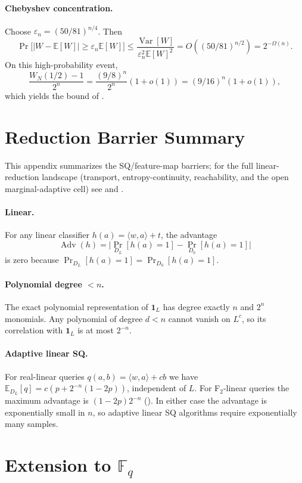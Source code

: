 \documentclass[11pt,a4paper]{article}
\theoremstyle{plain}
\theoremstyle{definition}
\newcommand{\F}{\mathbb{F}}
\newcommand{\E}{\mathbb{E}}
\DeclareMathOperator{\Adv}{Adv}
\DeclareMathOperator{\Var}{Var}
\begin{document}
\paragraph{Chebyshev concentration.}  Choose $\varepsilon_n = (50/81)^{n/4}$.  Then
\[
\Pr\bigl[|W-\E[W]| \ge \varepsilon_n \E[W]\bigr]
\le \frac{\Var[W]}{\varepsilon_n^2 \E[W]^2}
= O((50/81)^{n/2}) = 2^{-\Omega(n)}.
\]
On this high-probability event,
\[
\frac{W_N(1/2)-1}{2^n} = \frac{(9/8)^n}{2^n}(1+o(1)) = (9/16)^n(1+o(1)),
\]
which yields the bound of .

\section{Reduction Barrier Summary}
\label{app:barrier}

This appendix summarizes the SQ/feature-map barriers; for the full linear-reduction landscape (transport, entropy-continuity, reachability, and the open marginal-adaptive cell) see  and .

\paragraph{Linear.} For any linear classifier $h(a) = \langle w,a \rangle + t$, the advantage
\[
\Adv(h) = \bigl| \Pr_{D_L}[h(a)=1] - \Pr_{D_0}[h(a)=1] \bigr|
\]
is zero because $\Pr_{D_L}[h(a)=1] = \Pr_{D_0}[h(a)=1]$.

\paragraph{Polynomial degree $<n$.} The exact polynomial representation of $\mathbf{1}_L$ has degree exactly $n$ and $2^n$ monomials. Any polynomial of degree $d < n$ cannot vanish on $L^c$, so its correlation with $\mathbf{1}_L$ is at most $2^{-n}$.

\paragraph{Adaptive linear SQ.} For real-linear queries $q(a,b) = \langle w,a \rangle + cb$ we have $\E_{D_L}[q] = c(p + 2^{-n}(1-2p))$, independent of $L$. For F$_2$-linear queries the maximum advantage is $(1-2p)2^{-n}$ (). In either case the advantage is exponentially small in $n$, so adaptive linear SQ algorithms require exponentially many samples.

\section{Extension to $\F_q$}
\label{app:fq}
\end{document}
